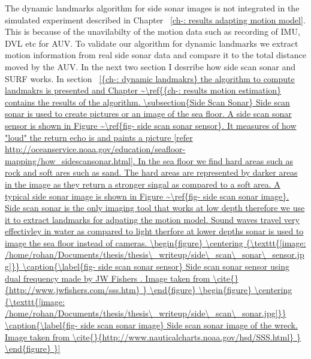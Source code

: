 \documentclass[12pt,draft]{dalcsthesis}
\begin{document}
The dynamic landmarks algorithm for side sonar images is not integrated in the simulated experiment described in Chapter ~\ref{ch-: results adapting motion model}. This is because of the unavilabilty of the motion data such as recording of IMU, DVL etc for AUV. To validate our algorithm for dynamic landmarks we extract motion information from real side sonar data and compare it to the total distance moved by the AUV. In the next two section I desrribe how side scan sonar and SURF works. In section ~\ref{{ch-: dynamic landmakrs} the algorithm to compute landmakrs is presented and Chapter ~\ref{{ch-: results motion estimation} contains the results of the algorithm.  

\subsection{Side Scan Sonar} 
Side scan sonar is used to create pictures or an image of the sea floor. A side scan sonar sensor is shown in Figure ~\ref{fig- side scan sonar sensor}. It measures of how "loud" the return echo is and paints a picture [refer http://oceanservice.noaa.gov/education/seafloor-mapping/how_sidescansonar.html]. In the sea floor we find  hard areas such as rock and soft ares such as sand. The hard areas are represented by darker areas in the image as they return a stronger singal as compared to a soft area. A typical side sonar image is shown in Figure ~\ref{fig- side scan sonar image}. Side scan sonar is the only imaging tool that works at low depth therefore we use it to extract landmarks for adpating the motion model. Sound waves travel very effectivley in water as compared to light therfore at lower depths sonar is used to image the sea floor instead of cameras. 
\begin{figure}
  \centering
     {\texttt{[image: /home/rohan/Documents/thesis/thesis\_writeup/side\_scan\_sonar\_sensor.jpg]}}
  \caption{\label{fig- side scan sonar sensor} Side scan sonar sensor using dual frequency made by JW Fishers . Image taken from \cite{}{http://www.jwfishers.com/sss.htm} }
\end{figure}

\begin{figure}
  \centering
     {\texttt{[image: /home/rohan/Documents/thesis/thesis\_writeup/side\_scan\_sonar.jpg]}}
  \caption{\label{fig- side scan sonar image} Side scan sonar image of the wreck. Image taken from \cite{}{http://www.nauticalcharts.noaa.gov/hsd/SSS.html} }
\end{figure}

}}
\end{document}

